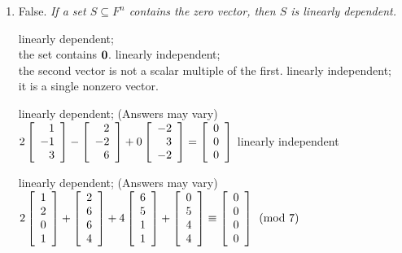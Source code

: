 
\begin{enumerate}[!HW!, start=1]
\item False. \emph{If a set $S\subseteq F^n$ contains the zero vector, then $S$ is linearly dependent.} %
\begin{multicols}{3}
\itemspade linearly dependent;\\ the set contains $\boldsymbol 0$.\columnbreak
\itemspade linearly independent;\\ the second vector is not a scalar multiple of the first.\columnbreak
\itemspade linearly independent;\\ it is a single nonzero vector.
\end{multicols}
\begin{multicols}{2}
\itemspade linearly dependent; (Answers may vary)\\ $2\left[\begin{array}{r} 1\\-1\\3 \end{array}\right] - \left[\begin{array}{r} 2\\-2\\6 \end{array}\right]+0\left[\begin{array}{r} -2\\3\\-2 \end{array}\right] = \left[\begin{array}{r} 0\\0\\0 \end{array}\right]$
\itemspade linearly independent
\end{multicols}
\itemspade linearly dependent; (Answers may vary) $2\left[\begin{array}{r} 1\\2\\0\\1 \end{array}\right] +  \left[\begin{array}{r} 2\\6\\6\\4 \end{array}\right] + 4\left[\begin{array}{r} 6\\5\\1\\1 \end{array}\right] +  \left[\begin{array}{r} 0\\5\\4\\4 \end{array}\right] \equiv\left[\begin{array}{r} 0\\0\\0\\0 \end{array}\right] \pmod 7$
\end{enumerate}

\vspace{-15 pt}